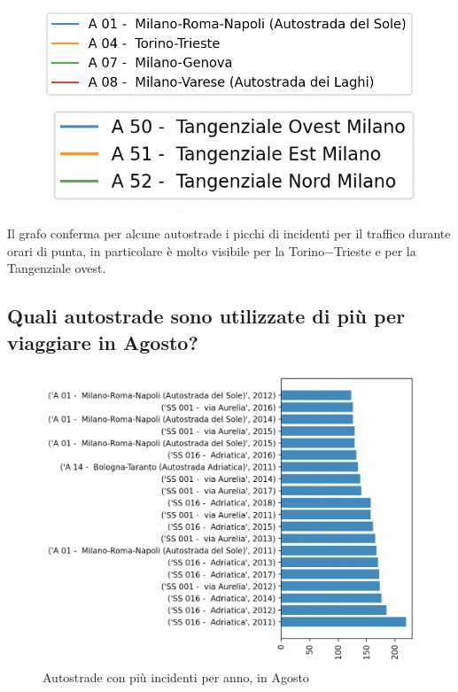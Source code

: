 \documentclass[a4paper]{report}
\begin{document}
\begin{figure}
    \includegraphics[width=0.6\linewidth]{../src/incidenti/incidenti_aci/autostrade/legenda_autostrade.png}
    \label{fig:legenda_autostrade}
    \includegraphics[width=0.5\linewidth]{../src/incidenti/incidenti_aci/autostrade/legenda_tangenziali.png}
    \label{fig:legenda_tangenziali}
\end{figure}

Il grafo conferma per alcune autostrade i picchi di incidenti per il traffico durante orari 
di punta, in particolare è molto visibile per la Torino$-$Trieste e per la Tangenziale ovest.


\subsection{Quali autostrade sono utilizzate di più per viaggiare in Agosto?}

\begin{figure}
    \includegraphics[width=\linewidth]{../src/incidenti/incidenti_aci/agosto/autostrade_anno_agosto.png}
    \caption{Autostrade con più incidenti per anno, in Agosto}
    \label{fig:autostrade_anno_agosto}
\end{figure}
\end{document}
